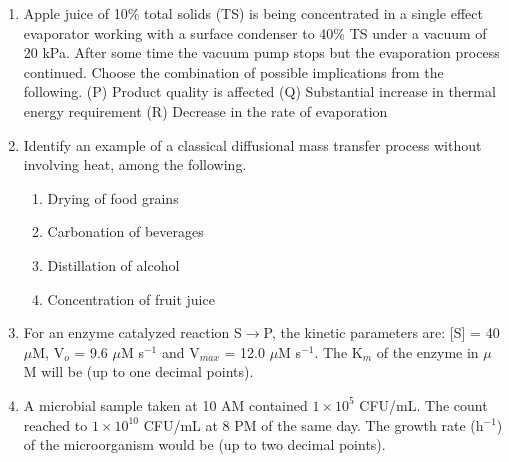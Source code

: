 \documentclass[a4paper,10pt]{article}
\begin{document}
\begin{enumerate}
    \item Apple juice of 10\% total solids (TS) is being concentrated in a single effect evaporator working with a surface condenser to 40\% TS under a vacuum of 20 kPa. After some time the vacuum pump stops but the evaporation process continued. Choose the combination of possible implications from the following.
    (P) Product quality is affected
    (Q) Substantial increase in thermal energy requirement
    (R) Decrease in the rate of evaporation
    \hfill{}
    \begin{enumerate}[label=\Alph*)]
    \end{enumerate}

    \item Identify an example of a classical diffusional mass transfer process without involving heat, among the following.
    \hfill{}
    \begin{enumerate}[label=\Alph*)]
        \item Drying of food grains
        \item Carbonation of beverages
        \item Distillation of alcohol
        \item Concentration of fruit juice
    \end{enumerate}

    \item For an enzyme catalyzed reaction S$\rightarrow$P, the kinetic parameters are:
    [S] = 40 $\mu$M, V$_o$ = 9.6 $\mu$M s$^{-1}$ and V$_{max}$ = 12.0 $\mu$M s$^{-1}$.
    The K$_m$ of the enzyme in $\mu$M will be \underline{\hspace{2cm}} (up to one decimal points).
    \hfill{}

    \item A microbial sample taken at 10 AM contained $1 \times 10^5$ CFU/mL. The count reached to $1 \times 10^{10}$ CFU/mL at 8 PM of the same day. The growth rate (h$^{-1}$) of the microorganism would be \underline{\hspace{2cm}} (up to two decimal points).
    \hfill{}


\end{enumerate}
\end{document}
